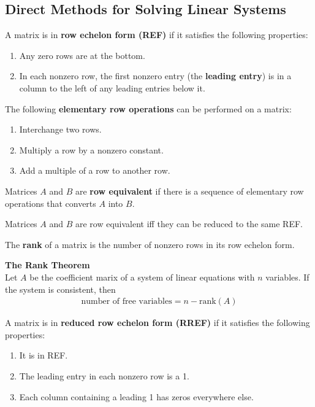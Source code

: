 \documentclass{article}
\begin{document}
\subsection{Direct Methods for Solving Linear Systems}
\begin{definition}
	A matrix is in \textbf{row echelon form (REF)} if it satisfies the following properties:
	\begin{enumerate}
		\item Any zero rows are at the bottom.
		\item In each nonzero row, the first nonzero entry (the \textbf{leading entry}) is in a column to the left of any leading entries below it.
	\end{enumerate}
\end{definition}
\begin{definition}
	The following \textbf{elementary row operations} can be performed on a matrix:
	\begin{enumerate}
		\item Interchange two rows.
		\item Multiply a row by a nonzero constant.
		\item Add a multiple of a row to another row.
	\end{enumerate}
\end{definition}
\begin{definition}
	Matrices $A$ and $B$ are \textbf{row equivalent} if there is a sequence of elementary row operations that converts $A$ into $B$.
\end{definition}
\begin{theorem}
	Matrices $A$ and $B$ are row equivalent iff they can be reduced to the same REF.
\end{theorem}
\begin{definition}
	The \textbf{rank} of a matrix is the number of nonzero rows in its row echelon form.
\end{definition}
\begin{theorem}
	\textbf{The Rank Theorem}\\
	Let $A$ be the coefficient marix of a system of linear equations with $n$ variables. If the system is consistent, then
	\begin{gather*}
		\text{number of free variables}=n-\text{rank}(A)
	\end{gather*}
\end{theorem}
\begin{definition}
	A matrix is in \textbf{reduced row echelon form (RREF)} if it satisfies the following properties:
	\begin{enumerate}
		\item It is in REF.
		\item The leading entry in each nonzero row is a 1.
		\item Each column containing a leading 1 has zeros everywhere else.
	\end{enumerate}
\end{definition}
\end{document}
